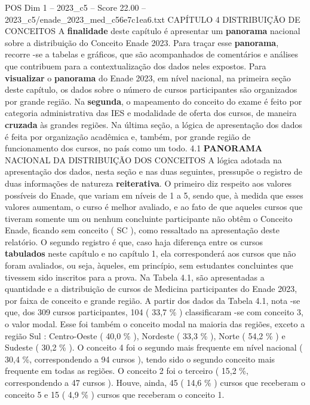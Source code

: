 \begin{textsample}{POS Dim 1 – 2023\_c5 – Score 22.00 – 2023\_c5/enade\_2023\_med\_c56e7c1ea6.txt}  \label{ex:f1_pos_006}
CAPÍTULO 4 DISTRIBUIÇÃO DE CONCEITOS A \textbf{finalidade} deste capítulo é apresentar um \textbf{panorama} nacional sobre a distribuição do Conceito Enade 2023.
Para traçar esse \textbf{panorama}, recorre -se a tabelas e gráficos, que são acompanhados de comentários e análises que contribuem para a contextualização dos dados neles expostos.
Para \textbf{visualizar} o \textbf{panorama} do Enade 2023, em nível nacional, na primeira seção deste capítulo, os dados sobre o número de cursos participantes são organizados por grande região.
Na \textbf{segunda}, o mapeamento do conceito do exame é feito por categoria administrativa das IES e modalidade de oferta dos cursos, de maneira \textbf{cruzada} às grandes regiões.
Na última seção, a lógica de apresentação dos dados é feita por organização acadêmica e, também, por grande região de funcionamento dos cursos, no país como um todo. 4.1 \textbf{PANORAMA} NACIONAL DA DISTRIBUIÇÃO DOS CONCEITOS A lógica adotada na apresentação dos dados, nesta seção e nas duas seguintes, pressupõe o registro de duas informações de natureza \textbf{reiterativa}.
O primeiro diz respeito aos valores possíveis do Enade, que variam em níveis de 1 a 5, sendo que, à medida que esses valores aumentam, o curso é melhor avaliado, e ao fato de que aqueles cursos que tiveram somente um ou nenhum concluinte participante não obtêm o Conceito Enade, ficando sem conceito ( SC ), como ressaltado na apresentação deste relatório.
O segundo registro é que, caso haja diferença entre os cursos \textbf{tabulados} neste capítulo e no capítulo 1, ela corresponderá aos cursos que não foram avaliados, ou seja, àqueles, em princípio, sem estudantes concluintes que tivessem sido inscritos para a prova.
Na Tabela 4.1, são apresentadas a quantidade e a distribuição de cursos de Medicina participantes do Enade 2023, por faixa de conceito e grande região.
A partir dos dados da Tabela 4.1, nota -se que, dos 309 cursos participantes, 104 ( 33,7 \% ) classificaram -se com conceito 3, o valor modal.
Esse foi também o conceito modal na maioria das regiões, exceto a região Sul : Centro-Oeste ( 40,0 \% ), Nordeste ( 33,3 \% ), Norte ( 54,2 \% ) e Sudeste ( 30,2 \% ).
O conceito 4 foi o segundo mais frequente em nível nacional ( 30,4 \%, correspondendo a 94 cursos ), tendo sido o segundo conceito mais frequente em todas as regiões.
O conceito 2 foi o terceiro ( 15,2 \%, correspondendo a 47 cursos ).
Houve, ainda, 45 ( 14,6 \% ) cursos que receberam o conceito 5 e 15 ( 4,9 \% ) cursos que receberam o conceito 1.

\end{textsample}
